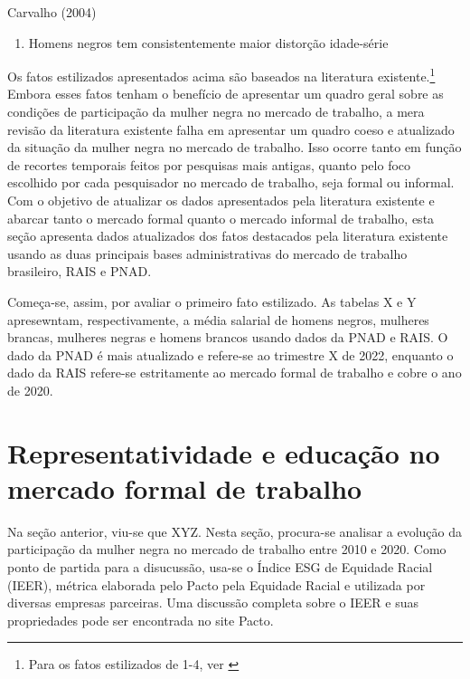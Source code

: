 \documentclass[12pt]{article}
\begin{document}
\par Carvalho (2004)

\begin{enumerate}
    \item Homens negros tem consistentemente maior distorção idade-série
\end{enumerate}



\par Os fatos estilizados apresentados acima são baseados na literatura existente.\footnote{Para os fatos estilizados de 1-4, ver \cite{soares2000perfil}} Embora esses fatos tenham o benefício de apresentar um quadro geral sobre as condições de participação da mulher negra no mercado de trabalho, a mera revisão da literatura existente falha em apresentar um quadro coeso e atualizado da situação da mulher negra no mercado de trabalho. Isso ocorre tanto em função de recortes temporais feitos por pesquisas mais antigas, quanto pelo foco escolhido por cada pesquisador no mercado de trabalho, seja formal ou informal. Com o objetivo de atualizar os dados apresentados pela literatura existente e abarcar tanto o mercado formal quanto o mercado informal de trabalho, esta seção apresenta dados atualizados dos fatos destacados pela literatura existente usando as duas principais bases administrativas do mercado de trabalho brasileiro, RAIS e PNAD.

\par Começa-se, assim, por avaliar o primeiro fato estilizado. As tabelas X e Y apresewntam, respectivamente, a média salarial de homens negros, mulheres brancas, mulheres negras e homens brancos usando dados da PNAD e RAIS. O dado da PNAD é mais atualizado e refere-se ao trimestre X de 2022, enquanto o dado da RAIS refere-se estritamente ao mercado formal de trabalho e cobre o ano de 2020.




\section{Representatividade e educação no mercado formal de trabalho} 

\par Na seção anterior, viu-se que XYZ. Nesta seção, procura-se analisar a evolução da participação da mulher negra no mercado de trabalho entre 2010 e 2020. Como ponto de partida para a disucussão, usa-se o Índice ESG de Equidade Racial (IEER), métrica elaborada pelo Pacto pela Equidade Racial e utilizada por diversas empresas parceiras. Uma discussão completa sobre o IEER e suas propriedades pode ser encontrada no site Pacto.
\end{document}
